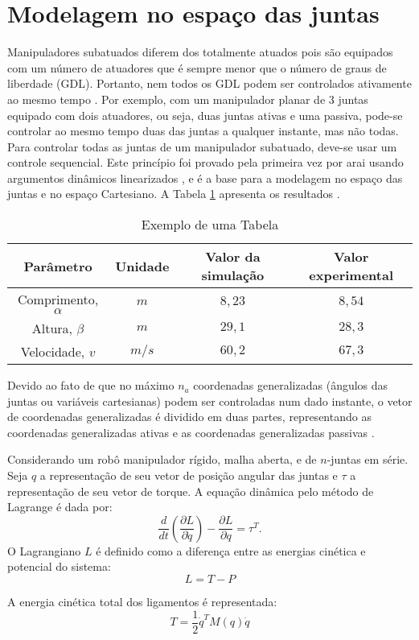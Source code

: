 \section{Modelagem no espaço das juntas}
Manipuladores subatuados diferem dos totalmente atuados pois são equipados com um número de atuadores que é sempre menor que o número de graus de liberdade (GDL). Portanto, nem todos os GDL podem ser controlados ativamente ao mesmo tempo \cite{Sbornian2004}. Por exemplo, com um manipulador planar de 3 juntas equipado com dois atuadores, ou seja, duas juntas ativas e
uma passiva, pode-se controlar ao mesmo tempo duas das juntas a qualquer instante, mas não todas. Para controlar todas as juntas de um manipulador subatuado, deve-se usar um controle sequencial. Este princípio foi provado pela primeira vez por {arai} usando  argumentos dinâmicos linearizados \cite{Joea2003}, e é a base para a modelagem no espaço das juntas e no espaço Cartesiano. A Tabela \ref{minhatab} apresenta os resultados \cite{Assenmacher1993,Silberschatz1991,Munoz2018}.

\begin{table}
\caption{Exemplo de uma Tabela}
\label{minhatab}

\center
\begin{tabular}{cccc}
  \hline
	Parâmetro & Unidade & Valor da simulação & Valor experimental   \\
	\hline
  Comprimento, $\alpha$ & $m$ &  $8,23$  & $8,54$ \\
  Altura, $\beta$ & $m$     &  $29,1$ & $28,3$\\
	Velocidade, $v$ & $m/s$  &  $60,2$ & $67,3$\\
	\hline
\end{tabular}
\end{table}

Devido ao fato de que no máximo $n_{a}$ coordenadas generalizadas (ângulos das juntas ou variáveis cartesianas) podem ser controladas num dado instante, o vetor de coordenadas generalizadas é dividido em duas partes, representando as coordenadas generalizadas ativas e as coordenadas generalizadas passivas \cite{Callaghan1995}.

Considerando um robô manipulador rígido, malha aberta, e de $n$-juntas em série. Seja $q$ a representação de seu vetor de posição angular das juntas  e $\tau$ a representação de seu vetor de torque. A equação dinâmica pelo método de
Lagrange é dada por:
\begin{equation} \label{eq:lagr1}
\frac{d}{dt}(\frac{\partial L}{\partial \dot{q}})-\frac{\partial L}{\partial q}=\tau^{T}.
\end{equation}
O Lagrangiano $L$ é definido como a diferença entre as energias cinética e potencial do sistema:
\begin{equation} \label{L}
L=T-P
\end{equation}

A energia cinética total dos ligamentos é representada:
\begin{equation} \label{energT}
T=\frac{1}{2}\dot{q}^{T}M(q)\dot{q}
\end{equation}

